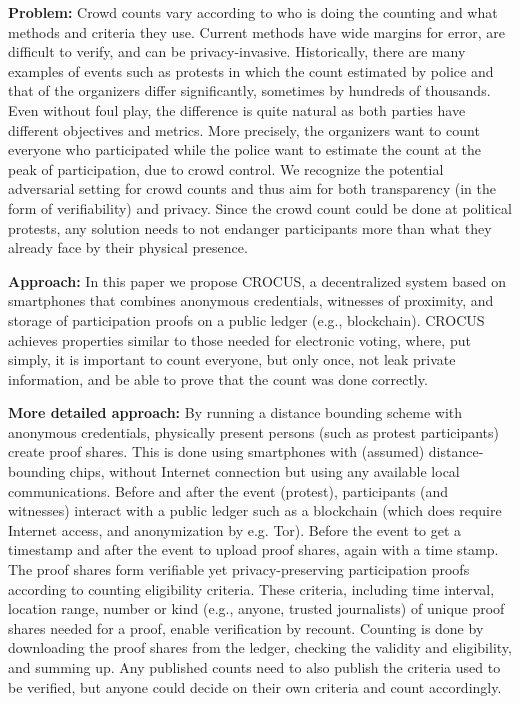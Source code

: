 



\textbf{Problem:}
Crowd counts vary according to who is doing the counting and what
methods and criteria they use. Current methods have wide margins for
error, are difficult to verify, and can be
privacy-invasive. Historically, there are many examples of events such
as protests in which the count estimated by police and that of the
organizers differ significantly, sometimes by hundreds of
thousands. Even without foul play, the difference is quite natural as
both parties have different objectives and metrics. More precisely,
the organizers want to count everyone who participated while the
police want to estimate the count at the peak of participation, due to
crowd control. We
recognize the potential adversarial setting for crowd counts and thus
aim for both transparency (in the form of verifiability) and
privacy. Since the crowd count could be done at political protests,
any solution needs to not endanger participants more than what they
already face by their physical presence.

\textbf{Approach:}
In this paper we propose CROCUS, a decentralized system based on
smartphones that combines anonymous credentials, witnesses of
proximity, and storage of participation proofs on a public ledger
(e.g., blockchain).
CROCUS achieves properties similar to those needed for
electronic voting, where, put simply, it is important to count
everyone, but only once, not leak private information, and be able to
prove that the count was done correctly. 


\textbf{More detailed approach:} 
By running a distance bounding scheme with anonymous credentials,
physically present persons (such as protest participants) create proof
shares. This is done using smartphones with (assumed)
distance-bounding chips, without Internet connection but using any
available local communications. Before and after the event (protest), participants (and
witnesses) interact with a public ledger such as a blockchain (which does require
Internet access, and anonymization by e.g. Tor). Before the event to get
a timestamp and after the event to upload proof shares, again with a
time stamp. The proof shares form verifiable yet privacy-preserving
participation proofs according to counting eligibility criteria. These criteria, including
time interval, location range, number or kind (e.g., anyone, trusted
journalists) of unique proof shares
needed for a proof, enable verification by recount. Counting is done
by downloading the proof shares from the ledger, checking the validity
and eligibility, and summing up. Any published counts need to also
publish the criteria used to be verified, but anyone could decide on
their own criteria and count accordingly. 

